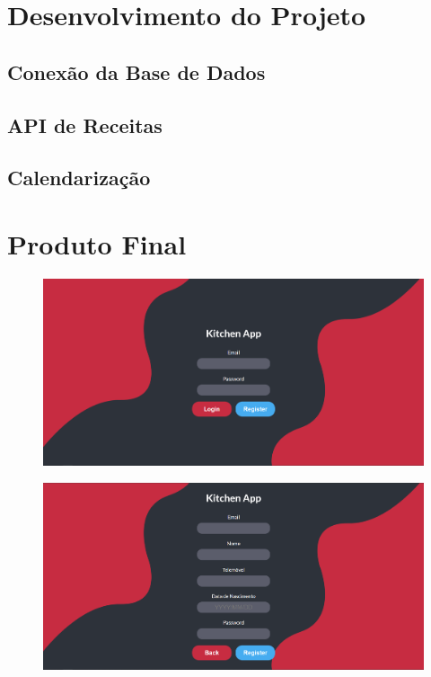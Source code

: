 \documentclass[a4paper]{report}
\begin{document}
\chapter{Desenvolvimento do Projeto}
    \section{Conexão da Base de Dados}
    \section{API de Receitas}
    \section{Calendarização}

\chapter{Produto Final}
    \begin{figure}[H]
        \centering
            \includegraphics[width=\textwidth]{images/produto_final/login.png}
    \end{figure}

    \begin{figure}[H]
        \centering
            \includegraphics[width=\textwidth]{images/produto_final/registo.png}
    \end{figure}
\end{document}
